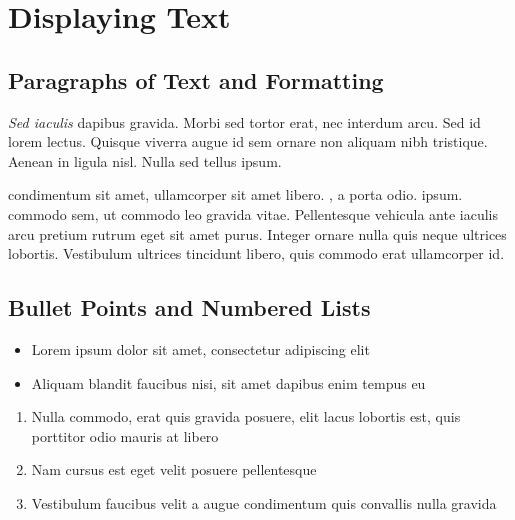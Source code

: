 \section{Displaying Text}
\label{section1}

\clearpage


\subsection{Paragraphs of Text and Formatting}

\textit{Sed iaculis} dapibus gravida. Morbi sed tortor erat, nec interdum arcu. Sed id lorem lectus. Quisque viverra augue id sem ornare non aliquam nibh tristique. Aenean in ligula nisl. Nulla sed tellus ipsum.

\begin{multicols}{2} %
     condimentum sit amet, ullamcorper sit amet libero.
    , a porta odio.
     ipsum.
     commodo sem, ut commodo leo gravida vitae. Pellentesque vehicula ante iaculis arcu pretium rutrum eget sit amet purus. Integer ornare nulla quis neque ultrices lobortis. Vestibulum ultrices tincidunt libero, quis commodo erat ullamcorper id.
\end{multicols}

\clearpage


\subsection{Bullet Points and Numbered Lists}

\begin{itemize}
    \item Lorem ipsum dolor sit amet, consectetur adipiscing elit
    \item Aliquam blandit faucibus nisi, sit amet dapibus enim tempus eu
\end{itemize}

\begin{enumerate}
    \item Nulla commodo, erat quis gravida posuere, elit lacus lobortis est, quis porttitor odio mauris at libero
    \item Nam cursus est eget velit posuere pellentesque
    \item Vestibulum faucibus velit a augue condimentum quis convallis nulla gravida
\end{enumerate}

